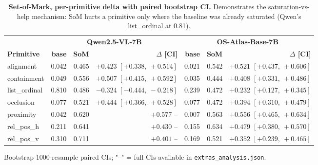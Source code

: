 \begin{table}[t]
\centering
\small
\begin{threeparttable}
\caption{\textbf{Set-of-Mark, per-primitive delta with paired bootstrap CI.}
Demonstrates the saturation-vs-help mechanism: SoM hurts a primitive only
where the baseline was already saturated (Qwen's list\_ordinal at 0.81).}
\label{tab:som-per-primitive}
\begin{tabular}{@{}lrrrrrr@{}}
\toprule
& \multicolumn{3}{c}{\textbf{Qwen2.5-VL-7B}} & \multicolumn{3}{c}{\textbf{OS-Atlas-Base-7B}} \\
\cmidrule(lr){2-4}\cmidrule(lr){5-7}
\textbf{Primitive} & \textbf{base} & \textbf{SoM} & \textbf{$\Delta$ [CI]}
                  & \textbf{base} & \textbf{SoM} & \textbf{$\Delta$ [CI]} \\
\midrule
alignment          & 0.042 & 0.465 & $+0.423$ $[+0.338,\ +0.514]$ & 0.021 & 0.542 & $+0.521$ $[+0.437,\ +0.606]$ \\
containment        & 0.049 & 0.556 & $+0.507$ $[+0.415,\ +0.592]$ & 0.035 & 0.444 & $+0.408$ $[+0.331,\ +0.486]$ \\
list\_ordinal      & 0.810 & 0.486 & $-0.324$ $[-0.444,\ -0.218]$ & 0.239 & 0.472 & $+0.232$ $[+0.127,\ +0.345]$ \\
occlusion          & 0.077 & 0.521 & $+0.444$ $[+0.366,\ +0.528]$ & 0.077 & 0.472 & $+0.394$ $[+0.310,\ +0.479]$ \\
proximity          & 0.042 & 0.620 & $+0.577$ -- & 0.007 & 0.563 & $+0.556$ $[+0.465,\ +0.634]$ \\
rel\_pos\_h        & 0.211 & 0.641 & $+0.430$ -- & 0.155 & 0.634 & $+0.479$ $[+0.380,\ +0.570]$ \\
rel\_pos\_v        & 0.310 & 0.711 & $+0.401$ -- & 0.169 & 0.521 & $+0.352$ $[+0.239,\ +0.465]$ \\
\bottomrule
\end{tabular}
\begin{tablenotes}
\footnotesize
\item Bootstrap 1000-resample paired CIs; "--" = full CIs available in
\texttt{extras\_analysis.json}.
\end{tablenotes}
\end{threeparttable}
\end{table}


